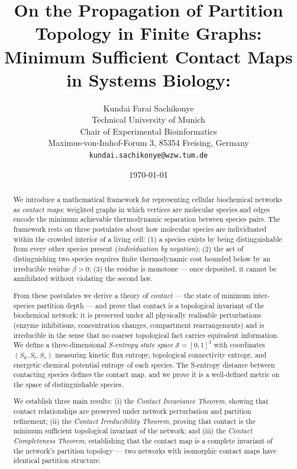 \documentclass[11pt,twocolumn]{article}
\title{On the Propagation of Partition Topology in Finite Graphs:\\ Minimum Sufficient Contact Maps in Systems Biology:}
\author{Kundai Farai Sachikonye\\[2pt]
\small Technical University of Munich \\
\small Chair of Experimental Bioinformatics\\
\small Maximus-von-Imhof-Forum 3, 85354 Freising, Germany\\
\small \texttt{kundai.sachikonye@wzw.tum.de}}
\date{\today}
\theoremstyle{plain}
\theoremstyle{definition}
\newcommand{\Sk}{S_k}
\newcommand{\St}{S_t}
\newcommand{\Se}{S_e}
\begin{document}
\maketitle

\begin{abstract}

We introduce a mathematical framework for representing cellular biochemical
networks as \emph{contact maps}: weighted graphs in which vertices are molecular
species and edges encode the minimum achievable thermodynamic separation between
species pairs. The framework rests on three postulates about how molecular
species are individuated within the crowded interior of a living cell: (1) a
species exists by being distinguishable from every other species present
(\emph{individuation by negation}); (2) the act of distinguishing two species
requires finite thermodynamic cost bounded below by an irreducible residue
$\beta > 0$; (3) the residue is monotone --- once deposited, it cannot be
annihilated without violating the second law.

From these postulates we derive a theory of \emph{contact} --- the state of
minimum inter-species partition depth --- and prove that contact is a
topological invariant of the biochemical network: it is preserved under all
physically realisable perturbations (enzyme inhibitions, concentration changes,
compartment rearrangements) and is irreducible in the sense that no coarser
topological fact carries equivalent information. We define a three-dimensional
\emph{S-entropy state space} $\mathcal{S} = [0,1]^3$ with coordinates
$(\Sk, \St, \Se)$ measuring kinetic flux entropy, topological connectivity
entropy, and energetic chemical potential entropy of each species. The
S-entropy distance between contacting species defines the contact map, and we
prove it is a well-defined metric on the space of distinguishable species.

We establish three main results: (i) the \emph{Contact Invariance Theorem},
showing that contact relationships are preserved under network perturbation and
partition refinement; (ii) the \emph{Contact Irreducibility Theorem}, proving
that contact is the minimum sufficient topological invariant of the network;
and (iii) the \emph{Contact Completeness Theorem}, establishing that the
contact map is a complete invariant of the network's partition topology --- two
networks with isomorphic contact maps have identical partition structure.


\end{abstract}
\end{document}

